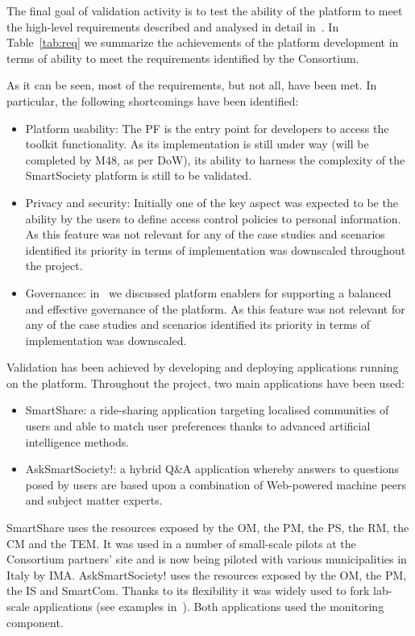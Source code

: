 

The final goal of validation activity is to test the ability of the platform to meet the high-level requirements %
described and analysed in detail in~\cite{D8.1}. In Table~\ref{tab:req} we summarize the achievements of the platform development in terms of ability to meet the requirements identified by the Consortium.

As it can be seen, most of the requirements, but not all, have been met. In particular, the following shortcomings have been identified:
\begin{itemize}
\item Platform usability: The PF is the entry point for developers to access the toolkit functionality. As its implementation is still under way (will be completed by M48, as per DoW), its ability to harness the complexity of the SmartSociety platform is still to be validated.
\item Privacy and security: Initially one of the key aspect was expected to be the ability by the users to define access control policies to personal information. As this feature was not relevant for any of the case studies and scenarios identified its priority in terms of implementation was downscaled throughout the project. 
\item Governance: in~\cite{D1.2} we discussed platform enablers for supporting a balanced and effective governance of the platform. As this feature was not relevant for any of the case studies and scenarios identified its priority in terms of implementation was downscaled. 
\end{itemize}

Validation has been achieved by developing and deploying applications running on the platform. Throughout the project, two main applications have been used:
\begin{itemize}
\item SmartShare: a ride-sharing application targeting localised communities of users and able to match user preferences thanks to advanced artificial intelligence methods. 
\item AskSmartSociety!: a hybrid Q\&A application whereby answers to questions posed by users are based upon a combination of Web-powered machine peers and subject matter experts.
\end{itemize}
SmartShare uses the resources exposed by the OM, the PM, the PS, the RM, the CM and the TEM. It was used in a number of small-scale pilots at the Consortium partners' site and is now being piloted with various municipalities in Italy by IMA.
AskSmartSociety! uses the resources exposed by the OM, the PM, the IS and SmartCom. Thanks to its flexibility it was widely used to fork lab-scale applications (see examples in~\cite{D8.3}).
Both applications used the monitoring component.

